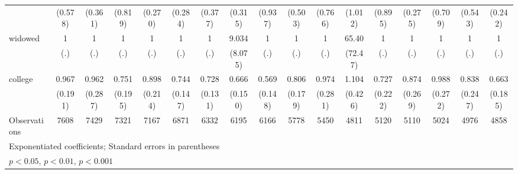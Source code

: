 {\begin{tabular}{l*{16}{c}}
                    &     (0.578)         &     (0.361)         &     (0.819)         &     (0.270)         &     (0.284)         &     (0.377)         &     (0.315)         &     (0.937)         &     (0.503)         &     (0.766)         &     (1.012)         &     (0.895)         &     (0.275)         &     (0.709)         &     (0.543)         &     (0.242)         \\
[1em]
widowed             &           1         &           1         &           1         &           1         &           1         &           1         &       9.034\sym{*}  &           1         &           1         &           1         &       65.40\sym{***}&           1         &           1         &           1         &           1         &           1         \\
                    &         (.)         &         (.)         &         (.)         &         (.)         &         (.)         &         (.)         &     (8.075)         &         (.)         &         (.)         &         (.)         &     (72.47)         &         (.)         &         (.)         &         (.)         &         (.)         &         (.)         \\
[1em]
college             &       0.967         &       0.962         &       0.751         &       0.898         &       0.744         &       0.728         &       0.666         &       0.569\sym{*}  &       0.806         &       0.974         &       1.104         &       0.727         &       0.874         &       0.988         &       0.838         &       0.663         \\
                    &     (0.191)         &     (0.287)         &     (0.195)         &     (0.214)         &     (0.147)         &     (0.131)         &     (0.150)         &     (0.148)         &     (0.179)         &     (0.281)         &     (0.426)         &     (0.222)         &     (0.269)         &     (0.272)         &     (0.247)         &     (0.185)         \\
\hline
Observations        &        7608         &        7429         &        7321         &        7167         &        6871         &        6332         &        6195         &        6166         &        5778         &        5450         &        4811         &        5120         &        5110         &        5024         &        4976         &        4858         \\
\hline\hline
\multicolumn{17}{l}{\footnotesize Exponentiated coefficients; Standard errors in parentheses}\\
\multicolumn{17}{l}{\footnotesize \sym{*} \(p<0.05\), \sym{**} \(p<0.01\), \sym{***} \(p<0.001\)}\\
\end{tabular}
}
